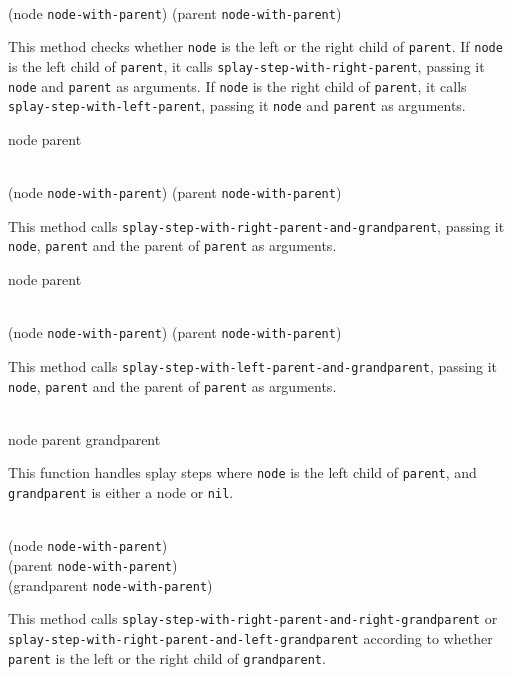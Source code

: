 \\
{(node \texttt{node-with-parent}) (parent \texttt{node-with-parent})}

This method checks whether \texttt{node} is the left or the right child
of \texttt{parent}.  If \texttt{node} is the left child of
\texttt{parent}, it calls \texttt{splay-step-with-right-parent},
passing it \texttt{node} and \texttt{parent} as arguments.  If
\texttt{node} is the right child of \texttt{parent}, it calls
\texttt{splay-step-with-left-parent}, passing it \texttt{node} and
\texttt{parent} as arguments.

 {node parent}

\\
{(node \texttt{node-with-parent}) (parent \texttt{node-with-parent})}

This method calls \texttt{splay-step-with-right-parent-and-grandparent},
passing it \texttt{node}, \texttt{parent} and the parent of
\texttt{parent} as arguments.

 {node parent}

\\
{(node \texttt{node-with-parent}) (parent \texttt{node-with-parent})}

This method calls \texttt{splay-step-with-left-parent-and-grandparent},
passing it \texttt{node}, \texttt{parent} and the parent of
\texttt{parent} as arguments.

\\
{node parent grandparent}

This function handles splay steps where \texttt{node} is the left
child of \texttt{parent}, and \texttt{grandparent} is either a node or
\texttt{nil}.

\\
{(node \texttt{node-with-parent})\\
 (parent \texttt{node-with-parent})\\
 (grandparent \texttt{node-with-parent})}

This method calls
\texttt{splay-step-with-right-parent-and-right-grandparent} or
\texttt{splay-step-with-right-parent-and-left-grandparent} according
to whether \texttt{parent} is the left or the right child of
\texttt{grandparent}.

